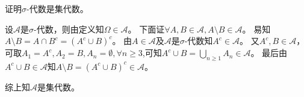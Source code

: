 \documentclass{ctexart}
\newif\ifpreface
\begin{document}
\large
\setlength{\baselineskip}{1.2em}
\ifpreface

\else
\maketitle
\fi
{}
\begin{problem}\label{pro:1.4.2}
  证明\(\sigma \)-代数是集代数。
\end{problem}
\begin{solution}
  设\(\mathcal{A} \)是\(\sigma \)-代数，则由定义知\(\Omega \in \mathcal{A} \)。
  下面证\( \forall A,B \in \mathcal{A},A \setminus B \in \mathcal{A} \)。
  易知\(A \setminus B = A \cap B^c = (A^c \cup B)^c \)。
  由\(A \in \mathcal{A} \)及\(\mathcal{A} \)是\(\sigma \)-代数知\(A^c \in \mathcal{A} \)。
  又\(A^c,B \in \mathcal{A} \)，可取\(A_1=A^c,A_2=B,A_n=\emptyset,\forall n \geq 3 \),可知\(A^c \cup B = \bigcup_{n \geq 1}A_n \in \mathcal{A} \)。
  最后由\(A^c \cup B \in \mathcal{A} \)知\(A \setminus B = (A^c \cup B)^c  \in \mathcal{A}\)。

  综上知\(\mathcal{A} \)是集代数。
\end{solution}
\end{document}
